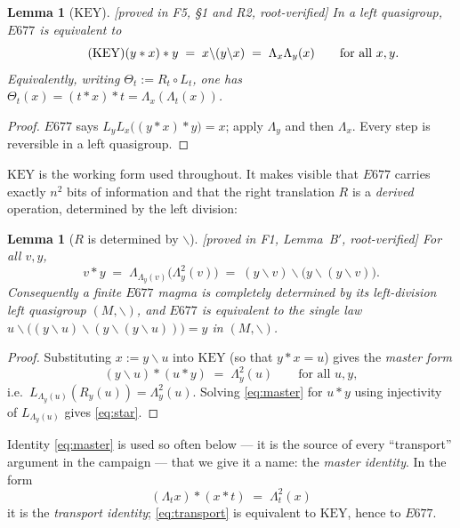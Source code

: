 \documentclass[11pt]{article}
\theoremstyle{plain}
\newtheorem{lemma}[theorem]{Lemma}
\theoremstyle{definition}
\theoremstyle{remark}
\numberwithin{equation}{section}
\newcommand{\op}{\mathbin{*}}
\newcommand{\statusbox}[1]{{\small\sloppy\textsf{[#1]}}}
\newcommand{\PROVED}[1]{\statusbox{proved in #1, root-verified}}
\begin{document}
\begin{lemma}[$\mathrm{KEY}$]\label{lem:key}
\PROVED{F5, \S1 and R2}
In a left quasigroup, $E677$ is equivalent to
\begin{equation*}
  \tag{$\mathrm{KEY}$}
  (y\op x)\op y \;=\; x\backslash(y\backslash x) \;=\; \Lambda_x\Lambda_y(x)
  \qquad \text{for all } x,y .
\end{equation*}
Equivalently, writing $\Theta_t := R_t\circ L_t$, one has
$\Theta_t(x) = (t\op x)\op t = \Lambda_x(\Lambda_t(x))$.
\end{lemma}

\begin{proof}
$E677$ says $L_yL_x\bigl((y\op x)\op y\bigr) = x$; apply $\Lambda_y$ and then $\Lambda_x$.
Every step is reversible in a left quasigroup.
\end{proof}

$\mathrm{KEY}$ is the working form used throughout. It makes visible that $E677$ carries
exactly $n^2$ bits of information and that the right translation $R$ is a \emph{derived}
operation, determined by the left division:

\begin{lemma}[$R$ is determined by $\backslash$]\label{lem:star}
\PROVED{F1, Lemma~B$'$}
For all $v,y$,
\begin{equation}\label{eq:star}
  v\op y \;=\; \Lambda_{\Lambda_y(v)}\bigl(\Lambda_y^2(v)\bigr)
        \;=\; (y\backslash v)\backslash\bigl(y\backslash(y\backslash v)\bigr).
\end{equation}
Consequently a finite $E677$ magma is completely determined by its left-division left
quasigroup $(M,\backslash)$, and $E677$ is equivalent to the single law
$u\backslash\bigl((y\backslash u)\backslash(y\backslash(y\backslash u))\bigr) = y$
in $(M,\backslash)$.
\end{lemma}

\begin{proof}
Substituting $x := y\backslash u$ into $\mathrm{KEY}$ (so that $y\op x = u$) gives the
\emph{master form}
\begin{equation}\label{eq:master}
  (y\backslash u)\op(u\op y) \;=\; \Lambda_y^2(u) \qquad\text{for all } u,y,
\end{equation}
i.e.\ $L_{\Lambda_y(u)}(R_y(u)) = \Lambda_y^2(u)$. Solving \eqref{eq:master} for $u\op y$
using injectivity of $L_{\Lambda_y(u)}$ gives \eqref{eq:star}.
\end{proof}

Identity \eqref{eq:master} is used so often below --- it is the source of every ``transport''
argument in the campaign --- that we give it a name: the \emph{master identity}. In the form
\begin{equation}\label{eq:transport}
  (\Lambda_t x)\op(x\op t) \;=\; \Lambda_t^2(x)
\end{equation}
it is the \emph{transport identity}; \eqref{eq:transport} is equivalent to
$\mathrm{KEY}$, hence to $E677$.
\end{document}
